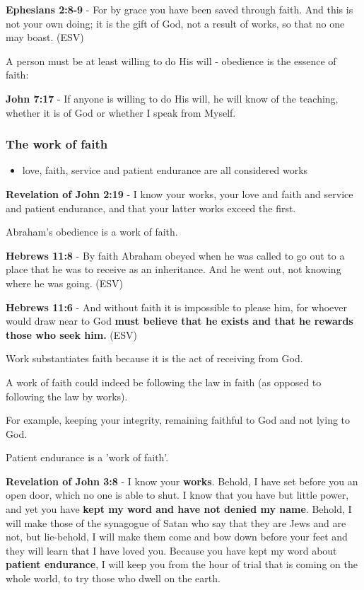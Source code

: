 \documentclass[11pt]{article}
\begin{document}
\textbf{Ephesians 2:8-9} - For by grace you have been saved through faith. And this is not your own doing; it is the gift of God, not a result of works, so that no one may boast. (ESV)

A person must be at least willing to do His will - obedience is the essence of faith:

\textbf{John 7:17} - If anyone is willing to do His will, he will know of the teaching, whether it is of God or whether I speak from Myself.

\subsubsection{The work of faith}
\label{sec:org47bb317}
\begin{itemize}
\item love, faith, service and patient endurance are all considered works
\end{itemize}

\textbf{Revelation of John 2:19} - I know your works, your love and faith and service and patient endurance, and that your latter works exceed the first.

Abraham's obedience is a work of faith.

\textbf{Hebrews 11:8} - By faith Abraham obeyed when he was called to go out to a place that he was to receive as an inheritance. And he went out, not knowing where he was going. (ESV)

\textbf{Hebrews 11:6} - And without faith it is impossible to please him, for whoever would draw near to God \textbf{must believe that he exists and that he rewards those who seek him.} (ESV)

Work substantiates faith because it is the act of receiving from God.

A work of faith could indeed be following the law in faith (as opposed to following the law by works).

For example, keeping your integrity, remaining faithful to God and not lying to God.

Patient endurance is a 'work of faith'.

\textbf{Revelation of John 3:8} - I know your \textbf{works}. Behold, I have set before you an open door, which no one is able to shut. I know that you have but little power, and yet you have \textbf{kept my word and have not denied my name}. Behold, I will make those of the synagogue of Satan who say that they are Jews and are not, but lie-behold, I will make them come and bow down before your feet and they will learn that I have loved you. Because you have kept my word about \textbf{patient endurance}, I will keep you from the hour of trial that is coming on the whole world, to try those who dwell on the earth.
\end{document}
